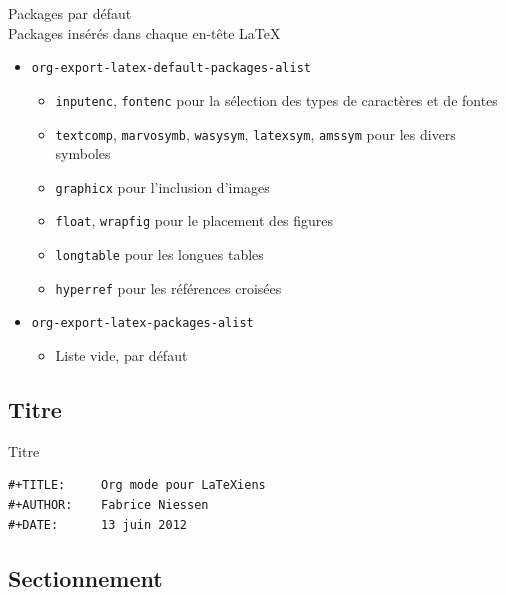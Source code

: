 \documentclass[presentation,t,hideothersubsections]{beamer}
\begin{document}
\begin{frame}[fragile,label=sec-2-2-1]{Packages par défaut \\ Packages insérés dans chaque en-tête \LaTeX{}}
 \begin{itemize}
\item \texttt{org-export-latex-default-packages-alist}
\begin{itemize}
\item \texttt{inputenc}, \texttt{fontenc} pour la sélection des types de caractères et de fontes
\item \texttt{textcomp}, \texttt{marvosymb}, \texttt{wasysym}, \texttt{latexsym}, \texttt{amssym} pour les divers symboles
\item \texttt{graphicx} pour l'inclusion d'images
\item \texttt{float}, \texttt{wrapfig} pour le placement des figures
\item \texttt{longtable} pour les longues tables
\item \texttt{hyperref} pour les références croisées
\end{itemize}

\item \texttt{org-export-latex-packages-alist}
\begin{itemize}
\item Liste vide, par défaut
\end{itemize}
\end{itemize}
\end{frame}
\subsection{Titre}
\label{sec-2-3}

\begin{frame}[fragile,label=sec-2-3-1]{Titre}
 \lstset{language=org,numbers=none}
\begin{lstlisting}
#+TITLE:     Org mode pour LaTeXiens
#+AUTHOR:    Fabrice Niessen
#+DATE:      13 juin 2012
\end{lstlisting}
\end{frame}
\subsection{Sectionnement}
\label{sec-2-4}
\end{document}
